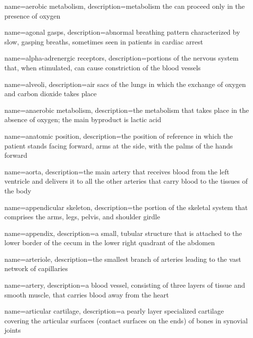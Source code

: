 \documentclass[../../EMT-169.tex]{subfiles}
\begin{document}
	{
		name=aerobic metabolism,
		description={metabolism the can proceed only in the presence of oxygen}
	}
	
	{
		name=agonal gasps,
		description={abnormal breathing pattern characterized by slow, gasping breaths, sometimes seen in patients in cardiac arrest}
	}
	
	{
		name=alpha-adrenergic receptors,
		description={portions of the nervous system that, when stimulated, can cause constriction of the blood vessels}
	}
	
	{
		name=alveoli,
		description={air sacs of the lungs in which the exchange of oxygen and carbon dioxide takes place}
	}
	
	{
		name=anaerobic metabolism,
		description={the metabolism that takes place in the absence of oxygen; the main byproduct is lactic acid}
	}
	
	{
		name=anatomic position,
		description={the position of reference in which the patient stands facing forward, arms at the side, with the palms of the hands forward}
	}

	{
		name=aorta,
		description={the main artery that receives blood from the left ventricle and delivers it to all the other arteries that carry blood to the tissues of the body}
	}

	{
		name=appendicular skeleton,
		description={the portion of the skeletal system that comprises the arms, legs, pelvis, and shoulder girdle}
	}
	
	{
		name=appendix,
		description={a small, tubular structure that is attached to the lower border of the cecum in the lower right quadrant of the abdomen}
	}

	{
		name=arteriole,
		description={the smallest branch of arteries leading to the vast network of capillaries}
	}

	{
		name=artery,
		description={a blood vessel, consisting of three layers of tissue and smooth muscle, that carries blood away from the heart}
	}

	{
		name=articular cartilage,
		description={a pearly layer specialized cartilage covering the articular surfaces (contact surfaces on the ends) of bones in synovial joints}
	}
\end{document}
